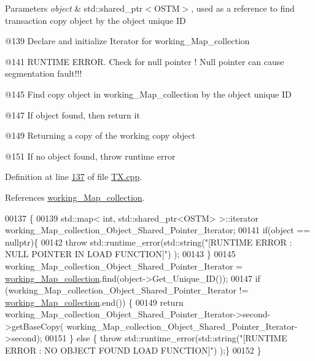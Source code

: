 \begin{DoxyParams}{Parameters}
{\em object} & std\+::shared\+\_\+ptr$<$\+O\+S\+T\+M$>$, used as a reference to find transaction copy object by the object unique ID \\
\hline
\end{DoxyParams}
@139 Declare and initialize Iterator for working\+\_\+\+Map\+\_\+collection

@141 R\+U\+N\+T\+I\+ME E\+R\+R\+OR. Check for null pointer ! Null pointer can cause segmentation fault!!!

@145 Find copy object in working\+\_\+\+Map\+\_\+collection by the object unique ID

@147 If object found, then return it

@149 Returning a copy of the working copy object

@151 If no object found, throw runtime error 

Definition at line \hyperlink{_t_x_8cpp_source_l00137}{137} of file \hyperlink{_t_x_8cpp_source}{T\+X.\+cpp}.



References \hyperlink{_t_x_8h_source_l00093}{working\+\_\+\+Map\+\_\+collection}.


\begin{DoxyCode}
00137                                                        \{
00139     std::map< int, std::shared\_ptr<OSTM> >::iterator working\_Map\_collection\_Object\_Shared\_Pointer\_Iterator;
00141     \textcolor{keywordflow}{if}(\textcolor{keywordtype}{object} == \textcolor{keyword}{nullptr})\{
00142         \textcolor{keywordflow}{throw} std::runtime\_error(std::string(\textcolor{stringliteral}{"[RUNTIME ERROR : NULL POINTER IN LOAD FUNCTION]"}) );
00143     \}
00145     working\_Map\_collection\_Object\_Shared\_Pointer\_Iterator = 
      \hyperlink{class_t_x_a81aafda16e2f20e36ec6c68e584668ff_a81aafda16e2f20e36ec6c68e584668ff}{working\_Map\_collection}.find(object->Get\_Unique\_ID());
00147     \textcolor{keywordflow}{if} (working\_Map\_collection\_Object\_Shared\_Pointer\_Iterator != 
      \hyperlink{class_t_x_a81aafda16e2f20e36ec6c68e584668ff_a81aafda16e2f20e36ec6c68e584668ff}{working\_Map\_collection}.end()) \{
00149         \textcolor{keywordflow}{return} working\_Map\_collection\_Object\_Shared\_Pointer\_Iterator->second->getBaseCopy(
      working\_Map\_collection\_Object\_Shared\_Pointer\_Iterator->second);  
00151     \} \textcolor{keywordflow}{else} \{ \textcolor{keywordflow}{throw} std::runtime\_error(std::string(\textcolor{stringliteral}{"[RUNTIME ERROR : NO OBJECT FOUND LOAD FUNCTION]"}) );\}
00152 \}
\end{DoxyCode}
